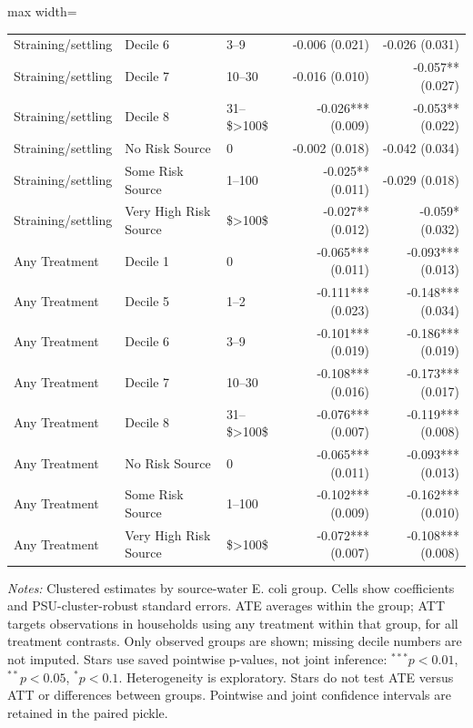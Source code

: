 \begin{table}[htbp]
\begin{adjustbox}{max width=\linewidth}
\begin{tabular}{lllrr}
Straining/settling & Decile 6 & 3--9 & -0.006 (0.021) & -0.026 (0.031) \\
Straining/settling & Decile 7 & 10--30 & -0.016 (0.010) & -0.057** (0.027) \\
Straining/settling & Decile 8 & 31--\$\textgreater{}100\$ & -0.026*** (0.009) & -0.053** (0.022) \\
Straining/settling & No Risk Source & 0 & -0.002 (0.018) & -0.042 (0.034) \\
Straining/settling & Some Risk Source & 1--100 & -0.025** (0.011) & -0.029 (0.018) \\
Straining/settling & Very High Risk Source & \$\textgreater{}100\$ & -0.027** (0.012) & -0.059* (0.032) \\
Any Treatment & Decile 1 & 0 & -0.065*** (0.011) & -0.093*** (0.013) \\
Any Treatment & Decile 5 & 1--2 & -0.111*** (0.023) & -0.148*** (0.034) \\
Any Treatment & Decile 6 & 3--9 & -0.101*** (0.019) & -0.186*** (0.019) \\
Any Treatment & Decile 7 & 10--30 & -0.108*** (0.016) & -0.173*** (0.017) \\
Any Treatment & Decile 8 & 31--\$\textgreater{}100\$ & -0.076*** (0.007) & -0.119*** (0.008) \\
Any Treatment & No Risk Source & 0 & -0.065*** (0.011) & -0.093*** (0.013) \\
Any Treatment & Some Risk Source & 1--100 & -0.102*** (0.009) & -0.162*** (0.010) \\
Any Treatment & Very High Risk Source & \$\textgreater{}100\$ & -0.072*** (0.007) & -0.108*** (0.008) \\
\bottomrule
\end{tabular}
\end{adjustbox}
\par\vspace{3pt}\begin{minipage}{\linewidth}\scriptsize\textit{Notes:} Clustered estimates by source-water E. coli group. Cells show coefficients and PSU-cluster-robust standard errors. ATE averages within the group; ATT targets observations in households using any treatment within that group, for all treatment contrasts. Only observed groups are shown; missing decile numbers are not imputed. Stars use saved pointwise p-values, not joint inference: $^{***}p<0.01$, $^{**}p<0.05$, $^{*}p<0.1$. Heterogeneity is exploratory. Stars do not test ATE versus ATT or differences between groups. Pointwise and joint confidence intervals are retained in the paired pickle.\end{minipage}
\end{table}
